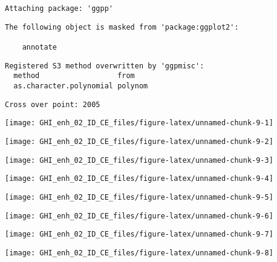 \documentclass[
  10pt,
  a4paper,oneside]{article}
\begin{document}
\begin{verbatim}
Attaching package: 'ggpp'
\end{verbatim}

\begin{verbatim}
The following object is masked from 'package:ggplot2':

    annotate
\end{verbatim}

\begin{verbatim}
Registered S3 method overwritten by 'ggpmisc':
  method                  from   
  as.character.polynomial polynom
\end{verbatim}

\begin{verbatim}
Cross over point: 2005 
\end{verbatim}

\begin{center}\texttt{[image: GHI\_enh\_02\_ID\_CE\_files/figure-latex/unnamed-chunk-9-1]} \end{center}

\begin{center}\texttt{[image: GHI\_enh\_02\_ID\_CE\_files/figure-latex/unnamed-chunk-9-2]} \end{center}

\begin{center}\texttt{[image: GHI\_enh\_02\_ID\_CE\_files/figure-latex/unnamed-chunk-9-3]} \end{center}

\begin{center}\texttt{[image: GHI\_enh\_02\_ID\_CE\_files/figure-latex/unnamed-chunk-9-4]} \end{center}

\begin{center}\texttt{[image: GHI\_enh\_02\_ID\_CE\_files/figure-latex/unnamed-chunk-9-5]} \end{center}

\begin{center}\texttt{[image: GHI\_enh\_02\_ID\_CE\_files/figure-latex/unnamed-chunk-9-6]} \end{center}

\begin{center}\texttt{[image: GHI\_enh\_02\_ID\_CE\_files/figure-latex/unnamed-chunk-9-7]} \end{center}

\begin{center}\texttt{[image: GHI\_enh\_02\_ID\_CE\_files/figure-latex/unnamed-chunk-9-8]} \end{center}
\end{document}
